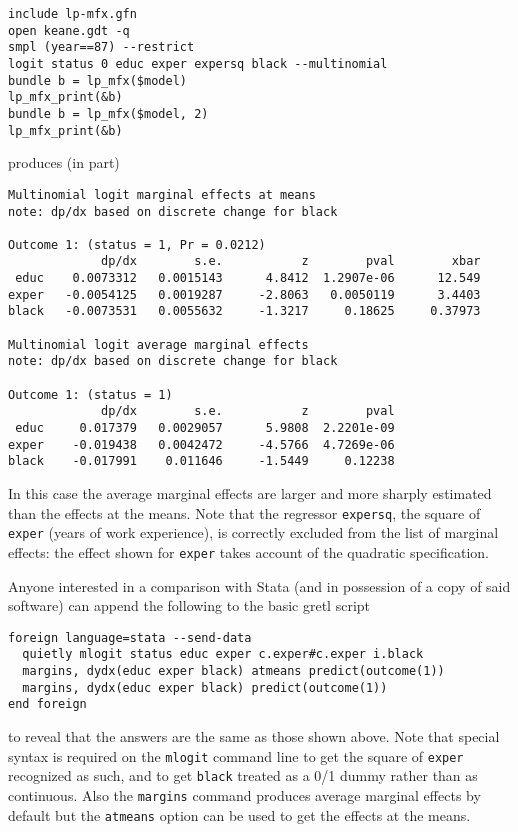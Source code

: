 \documentclass{article}
\begin{document}
{\small
\begin{verbatim}
include lp-mfx.gfn
open keane.gdt -q
smpl (year==87) --restrict
logit status 0 educ exper expersq black --multinomial
bundle b = lp_mfx($model)
lp_mfx_print(&b)
bundle b = lp_mfx($model, 2)
lp_mfx_print(&b)
\end{verbatim}
}
produces (in part)
{\small
\begin{verbatim}
Multinomial logit marginal effects at means
note: dp/dx based on discrete change for black

Outcome 1: (status = 1, Pr = 0.0212)
             dp/dx        s.e.           z        pval        xbar
 educ    0.0073312   0.0015143      4.8412  1.2907e-06      12.549
exper   -0.0054125   0.0019287     -2.8063   0.0050119      3.4403
black   -0.0073531   0.0055632     -1.3217     0.18625     0.37973

Multinomial logit average marginal effects
note: dp/dx based on discrete change for black 

Outcome 1: (status = 1)
             dp/dx        s.e.           z        pval
 educ     0.017379   0.0029057      5.9808  2.2201e-09
exper    -0.019438   0.0042472     -4.5766  4.7269e-06
black    -0.017991    0.011646     -1.5449     0.12238
\end{verbatim}
}
In this case the average marginal effects are larger and more sharply
estimated than the effects at the means. Note that the regressor
\texttt{expersq}, the square of \texttt{exper} (years of work
experience), is correctly excluded from the list of marginal effects:
the effect shown for \texttt{exper} takes account of the quadratic
specification.

Anyone interested in a comparison with \textsf{Stata} (and in
possession of a copy of said software) can append the following to the
basic gretl script
{\small
\begin{verbatim}
foreign language=stata --send-data
  quietly mlogit status educ exper c.exper#c.exper i.black
  margins, dydx(educ exper black) atmeans predict(outcome(1))
  margins, dydx(educ exper black) predict(outcome(1))
end foreign
\end{verbatim}
} to reveal that the answers are the same as those shown above. Note
that special syntax is required on the \texttt{mlogit} command line to
get the square of \texttt{exper} recognized as such, and to get
\texttt{black} treated as a 0/1 dummy rather than as continuous. Also
the \texttt{margins} command produces average marginal effects by
default but the \texttt{atmeans} option can be used to get the effects
at the means.
\end{document}

